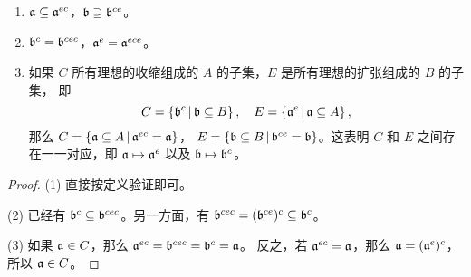\begin{proposition}\label{prop:property of extension and contraction}
  \mbox{}
  \begin{enumerate}
    \item $\mathfrak{a}\subseteq\mathfrak{a}^{ec}$，$\mathfrak{b}\supseteq\mathfrak{b}^{ce}$。
    \item $\mathfrak{b}^c=\mathfrak{b}^{cec}$，$\mathfrak{a}^e=\mathfrak{a}^{ece}$。
    \item 如果 $C$ 所有理想的收缩组成的 $A$ 的子集，$E$ 是所有理想的扩张组成的 $B$ 的子集，
    即
    \[
      C=\left\{\mathfrak{b}^c\,\middle|\, \mathfrak{b}\subseteq B\right\}  ,\quad 
      E=\left\{\mathfrak{a}^e\,\middle|\, \mathfrak{a}\subseteq A\right\}  ,
    \]
    那么 $C=\{\mathfrak{a}\subseteq A\,|\, \mathfrak{a}^{ec}=\mathfrak{a}\}$，
    $E=\{\mathfrak{b}\subseteq B\,|\, \mathfrak{b}^{ce}=\mathfrak{b}\}$。这表明 $C$ 和
    $E$ 之间存在一一对应，即 $\mathfrak{a}\mapsto \mathfrak{a}^e$ 以及 $\mathfrak{b}\mapsto \mathfrak{b}^c$。
  \end{enumerate}
\end{proposition}
\begin{proof}
  (1) 直接按定义验证即可。

  (2) 已经有 $\mathfrak{b}^c\subseteq\mathfrak{b}^{cec}$。另一方面，有
  $\mathfrak{b}^{cec}=(\mathfrak{b}^{ce})^{c}\subseteq \mathfrak{b}^c$。

  (3) 如果 $\mathfrak{a}\in C$，那么 $\mathfrak{a}^{ec}=\mathfrak{b}^{cec}=\mathfrak{b}^c=\mathfrak{a}$。
  反之，若 $\mathfrak{a}^{ec}=\mathfrak{a}$，那么 $\mathfrak{a}=(\mathfrak{a}^e)^c$，所以
  $\mathfrak{a}\in C$。
\end{proof}

